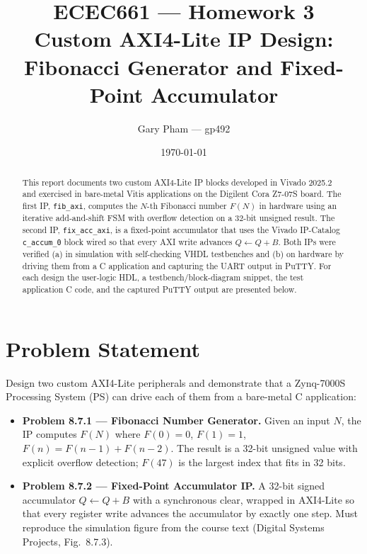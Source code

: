 \documentclass[12pt]{article}
\title{ECEC661 --- Homework 3\\
       \large Custom AXI4-Lite IP Design: Fibonacci Generator and
       Fixed-Point Accumulator}
\author{Gary Pham --- gp492}
\date{\today}
\begin{document}
\maketitle
\thispagestyle{fancy}

\begin{abstract}
This report documents two custom AXI4-Lite IP blocks developed in
Vivado 2025.2 and exercised in bare-metal Vitis applications on the
Digilent Cora Z7-07S board. The first IP, \texttt{fib\_axi}, computes
the $N$-th Fibonacci number $F(N)$ in hardware using an iterative
add-and-shift FSM with overflow detection on a 32-bit unsigned result.
The second IP, \texttt{fix\_acc\_axi}, is a fixed-point accumulator
that uses the Vivado IP-Catalog \texttt{c\_accum\_0} block wired so
that every AXI write advances $Q \leftarrow Q + B$. Both IPs were
verified (a) in simulation with self-checking VHDL testbenches and
(b) on hardware by driving them from a C application and capturing
the UART output in PuTTY. For each design the user-logic HDL, a
testbench/block-diagram snippet, the test application C code, and
the captured PuTTY output are presented below.
\end{abstract}

\section{Problem Statement}
\label{sec:problem}

Design two custom AXI4-Lite peripherals and demonstrate that a
Zynq-7000S Processing System (PS) can drive each of them from a
bare-metal C application:

\begin{itemize}[nosep]
  \item \textbf{Problem 8.7.1 --- Fibonacci Number Generator.}
        Given an input $N$, the IP computes
        $F(N)$ where $F(0){=}0$, $F(1){=}1$,
        $F(n){=}F(n{-}1)+F(n{-}2)$. The result is a 32-bit unsigned
        value with explicit overflow detection; $F(47)$ is the
        largest index that fits in 32 bits.
  \item \textbf{Problem 8.7.2 --- Fixed-Point Accumulator IP.}
        A 32-bit signed accumulator $Q \leftarrow Q + B$ with a
        synchronous clear, wrapped in AXI4-Lite so that every
        register write advances the accumulator by exactly one
        step. Must reproduce the simulation figure from the course
        text (Digital Systems Projects, Fig.~8.7.3).
\end{itemize}
\end{document}
